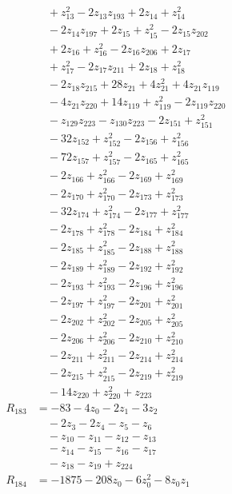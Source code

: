 \begin{align*}
&\quad +z_{13}^{2} -2z_{13}z_{193} +2z_{14} +z_{14}^{2} \\
&\quad -2z_{14}z_{197} +2z_{15} +z_{15}^{2} -2z_{15}z_{202} \\
&\quad +2z_{16} +z_{16}^{2} -2z_{16}z_{206} +2z_{17} \\
&\quad +z_{17}^{2} -2z_{17}z_{211} +2z_{18} +z_{18}^{2} \\
&\quad -2z_{18}z_{215} +28z_{21} +4z_{21}^{2} +4z_{21}z_{119} \\
&\quad -4z_{21}z_{220} +14z_{119} +z_{119}^{2} -2z_{119}z_{220} \\
&\quad -z_{129}z_{223} -z_{130}z_{223} -2z_{151} +z_{151}^{2} \\
&\quad -32z_{152} +z_{152}^{2} -2z_{156} +z_{156}^{2} \\
&\quad -72z_{157} +z_{157}^{2} -2z_{165} +z_{165}^{2} \\
&\quad -2z_{166} +z_{166}^{2} -2z_{169} +z_{169}^{2} \\
&\quad -2z_{170} +z_{170}^{2} -2z_{173} +z_{173}^{2} \\
&\quad -32z_{174} +z_{174}^{2} -2z_{177} +z_{177}^{2} \\
&\quad -2z_{178} +z_{178}^{2} -2z_{184} +z_{184}^{2} \\
&\quad -2z_{185} +z_{185}^{2} -2z_{188} +z_{188}^{2} \\
&\quad -2z_{189} +z_{189}^{2} -2z_{192} +z_{192}^{2} \\
&\quad -2z_{193} +z_{193}^{2} -2z_{196} +z_{196}^{2} \\
&\quad -2z_{197} +z_{197}^{2} -2z_{201} +z_{201}^{2} \\
&\quad -2z_{202} +z_{202}^{2} -2z_{205} +z_{205}^{2} \\
&\quad -2z_{206} +z_{206}^{2} -2z_{210} +z_{210}^{2} \\
&\quad -2z_{211} +z_{211}^{2} -2z_{214} +z_{214}^{2} \\
&\quad -2z_{215} +z_{215}^{2} -2z_{219} +z_{219}^{2} \\
&\quad -14z_{220} +z_{220}^{2} +z_{223} \\
R_{183} &= -83 -4z_{0} -2z_{1} -3z_{2} \\
&\quad -2z_{3} -2z_{4} -z_{5} -z_{6} \\
&\quad -z_{10} -z_{11} -z_{12} -z_{13} \\
&\quad -z_{14} -z_{15} -z_{16} -z_{17} \\
&\quad -z_{18} -z_{19} +z_{224} \\
R_{184} &= -1875 -208z_{0} -6z_{0}^{2} -8z_{0}z_{1} \\

\end{align*}
